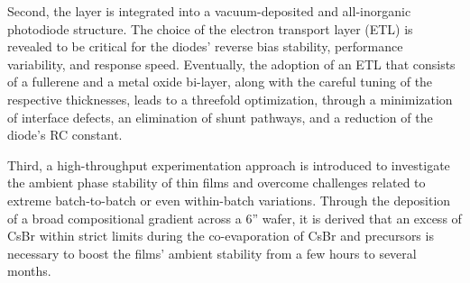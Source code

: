 Second, the  layer is integrated into a vacuum-deposited and all-inorganic photodiode structure. The choice of the electron transport layer (ETL) is revealed to be critical for the diodes' reverse bias stability, performance variability, and response speed. Eventually, the adoption of an ETL that consists of a fullerene and a metal oxide bi-layer, along with the careful tuning of the respective thicknesses, leads to a threefold optimization, through a minimization of interface defects, an elimination of shunt pathways, and a reduction of the diode's RC constant. 

Third, a high-throughput experimentation approach is introduced to investigate the ambient phase stability of  thin films and overcome challenges related to extreme batch-to-batch or even within-batch variations. Through the deposition of a broad compositional gradient across a 6'' wafer, it is derived that an excess of CsBr within strict limits during the co-evaporation of CsBr and  precursors is necessary to boost the films' ambient stability from a few hours to several months. 

\cleardoublepage

